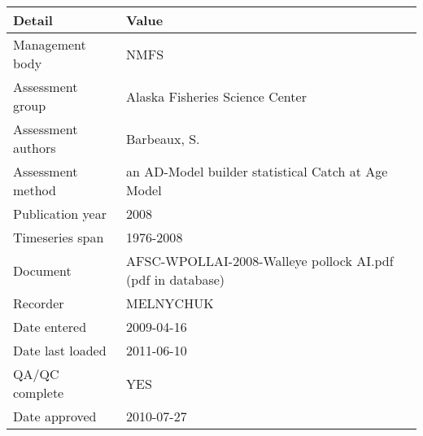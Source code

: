 \begin{table}[htb]
\centering
\begin{tabular}{lp{7cm}}
\toprule
Detail & Value \\
\midrule
Management body    & NMFS                                                       \\
Assessment group   & Alaska Fisheries Science Center                            \\
Assessment authors & Barbeaux, S.                                               \\
Assessment method  & an AD-Model builder statistical Catch at Age Model         \\
Publication year   & 2008                                                       \\
Timeseries span    & 1976-2008                                                  \\
Document           & AFSC-WPOLLAI-2008-Walleye pollock AI.pdf (pdf in database) \\
Recorder           & MELNYCHUK                                                  \\
Date entered       & 2009-04-16                                                 \\
Date last loaded   & 2011-06-10                                                 \\
QA/QC complete     & YES                                                        \\
Date approved      & 2010-07-27                                                 \\
\bottomrule
\end{tabular}
\label{tab:assessdet}
\end{table}
